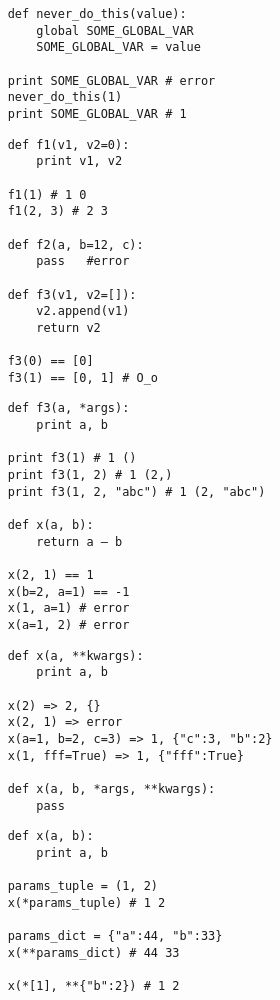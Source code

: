 \documentclass{article}
\begin{document}
\vspace{15pt}
\begin{lstlisting}
	def never_do_this(value):
	    global SOME_GLOBAL_VAR
	    SOME_GLOBAL_VAR = value

	print SOME_GLOBAL_VAR # error
	never_do_this(1)
	print SOME_GLOBAL_VAR # 1
\end{lstlisting}
\newpage

\vspace{15pt}
\begin{lstlisting}
	def f1(v1, v2=0):
	    print v1, v2

	f1(1) # 1 0
	f1(2, 3) # 2 3

	def f2(a, b=12, c):
		pass   #error

	def f3(v1, v2=[]):
	    v2.append(v1)
	    return v2

	f3(0) == [0]
	f3(1) == [0, 1] # O_o
\end{lstlisting}
\newpage

\vspace{15pt}
\begin{lstlisting}
	def f3(a, *args):
	    print a, b

	print f3(1) # 1 ()
	print f3(1, 2) # 1 (2,)
	print f3(1, 2, "abc") # 1 (2, "abc")

	def x(a, b):
	    return a – b

	x(2, 1) == 1
	x(b=2, a=1) == -1
	x(1, a=1) # error
	x(a=1, 2) # error
\end{lstlisting}
\newpage

\vspace{15pt}
\begin{lstlisting}
	def x(a, **kwargs):
	    print a, b

	x(2) => 2, {}
	x(2, 1) => error
	x(a=1, b=2, c=3) => 1, {"c":3, "b":2}
	x(1, fff=True) => 1, {"fff":True}

	def x(a, b, *args, **kwargs):
	    pass
\end{lstlisting}
\newpage

\vspace{15pt}
\begin{lstlisting}
	def x(a, b):
	    print a, b

	params_tuple = (1, 2)
	x(*params_tuple) # 1 2

	params_dict = {"a":44, "b":33}
	x(**params_dict) # 44 33

	x(*[1], **{"b":2}) # 1 2
\end{lstlisting}
\newpage
\end{document}
